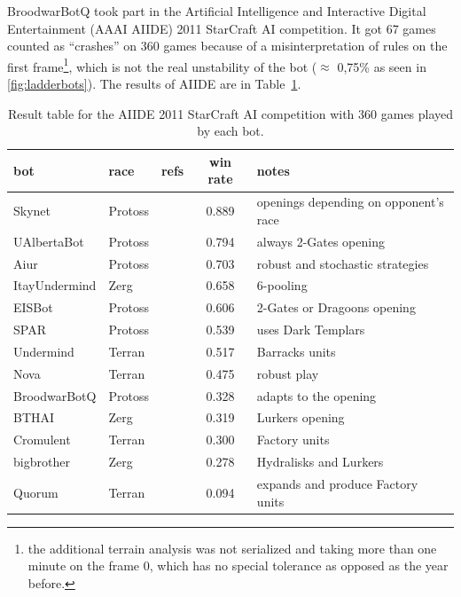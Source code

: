 BroodwarBotQ took part in the Artificial Intelligence and Interactive Digital Entertainment (AAAI AIIDE) 2011 StarCraft AI competition. It got 67 games counted as ``crashes'' on 360 games because of a misinterpretation of rules on the first frame\footnote{the additional terrain analysis was not serialized and taking more than one minute on the frame 0, which has no special tolerance as opposed as the year before.}, which is not the real unstability of the bot ($\approx$ 0,75\% as seen in \ref{fig:ladderbots}). The results of AIIDE are in Table~\ref{tab:botsAIIDE}.

\begin{table}[h]
    \begin{center}
    \begin{scriptsize}
    \begin{tabular}{|l|l|l|c|l|}
        \hline
        bot & race & refs & win rate & notes \\
        \hline
     Skynet%
& Protoss & & 0.889 & openings depending on opponent's race \\
UAlbertaBot & Protoss & \citep{Churchill2011} & 0.794 & always 2-Gates opening \\
       Aiur%
& Protoss & & 0.703 & robust and stochastic strategies \\
ItayUndermind & Zerg & & 0.658 & 6-pooling \\
       EISBot%
& Protoss & \citep{WeberCIG10,Weber2010cr} & 0.606 & 2-Gates or Dragoons opening \\
         SPAR%
& Protoss & \citep{Kabanza2010} & 0.539 & uses Dark Templars \\
    Undermind & Terran & & 0.517 & Barracks units \\
         Nova%
& Terran & \citep{NovaBot2011} &  0.475 & robust play \\
 BroodwarBotQ%
& Protoss  & %
& 0.328 & adapts to the opening \\
        BTHAI%
& Zerg & \citep{Hagelback2009} & 0.319 & Lurkers opening  \\
    Cromulent & Terran & & 0.300 & Factory units \\
   bigbrother & Zerg & & 0.278 & Hydralisks and Lurkers \\
       Quorum & Terran & & 0.094 & expands and produce Factory units \\
        \hline
    \end{tabular}
    \end{scriptsize}
    \end{center}
    \caption{Result table for the AIIDE 2011 StarCraft AI competition with 360 games played by each bot.}
    \label{tab:botsAIIDE}
\end{table}
